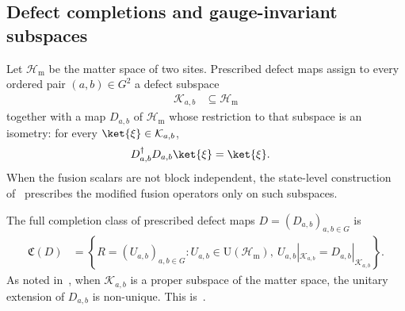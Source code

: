 \subsection{Defect completions and gauge-invariant subspaces}

\begin{definition}
    \label{def:mpug_defect_maps}
    \leanok
    Let $\mathcal H_{\mathrm m}$ be the matter space of two sites. Prescribed
    defect maps assign to every ordered pair $(a,b)\in G^2$ a defect subspace
    \begin{align}
        \mathcal K_{a,b} & \subseteq\mathcal H_{\mathrm m}
    \end{align}
    together with a map $D_{a,b}$ of $\mathcal H_{\mathrm m}$ whose
    restriction to that subspace is an isometry: for every
    $\ket{\xi}\in\mathcal K_{a,b}$,
    \begin{align}
        D_{a,b}^\dagger D_{a,b}\ket{\xi}
         & =\ket{\xi}.
        \label{eq:mpug_defect_isometry}
    \end{align}
    When the fusion scalars are not block independent, the state-level
    construction of~\cite[lines~4215--4326]{FrancoRubio2025MPUGauging}
    prescribes the modified fusion operators only on such subspaces.
\end{definition}

\begin{definition}
    \label{def:mpug_completion_class}
    \leanok
    The full completion class of prescribed defect maps
    $D=(D_{a,b})_{a,b\in G}$ is
    \begin{align}
        \mathfrak C(D)
         & =\left\{R=(U_{a,b})_{a,b\in G}:
        U_{a,b}\in\mathrm U(\mathcal H_{\mathrm m}),\
        U_{a,b}|_{\mathcal K_{a,b}}=D_{a,b}|_{\mathcal K_{a,b}}\right\}.
        \label{eq:mpug_completion_class}
    \end{align}
    As noted in~\cite[lines~4215--4326]{FrancoRubio2025MPUGauging}, when
    $\mathcal K_{a,b}$ is a proper subspace of the matter space, the unitary
    extension of $D_{a,b}$ is non-unique.
    This is~\cite[``Full unitary completion class'']{QICLean2026Blueprint}.
\end{definition}

